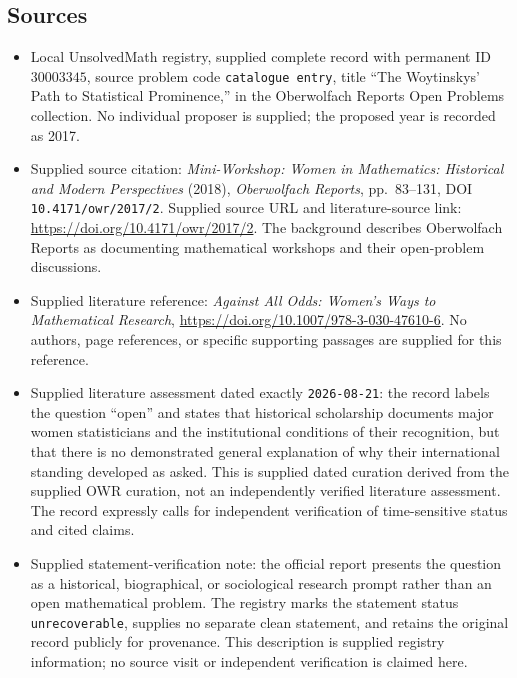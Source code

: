 \documentclass[11pt]{article}
\begin{document}
\subsection{Sources}
\begin{itemize}
\item Local UnsolvedMath registry, supplied complete record with permanent ID \(30003345\), source problem code \texttt{catalogue entry}, title ``The Woytinskys' Path to Statistical Prominence,'' in the Oberwolfach Reports Open Problems collection. No individual proposer is supplied; the proposed year is recorded as 2017.
\item Supplied source citation: \emph{Mini-Workshop: Women in Mathematics: Historical and Modern Perspectives} (2018), \emph{Oberwolfach Reports}, pp.~83--131, DOI \texttt{10.4171/owr/2017/2}. Supplied source URL and literature-source link: \url{https://doi.org/10.4171/owr/2017/2}. The background describes Oberwolfach Reports as documenting mathematical workshops and their open-problem discussions.
\item Supplied literature reference: \emph{Against All Odds: Women's Ways to Mathematical Research}, \url{https://doi.org/10.1007/978-3-030-47610-6}. No authors, page references, or specific supporting passages are supplied for this reference.
\item Supplied literature assessment dated exactly \texttt{2026-08-21}: the record labels the question ``open'' and states that historical scholarship documents major women statisticians and the institutional conditions of their recognition, but that there is no demonstrated general explanation of why their international standing developed as asked. This is supplied dated curation derived from the supplied OWR curation, not an independently verified literature assessment. The record expressly calls for independent verification of time-sensitive status and cited claims.
\item Supplied statement-verification note: the official report presents the question as a historical, biographical, or sociological research prompt rather than an open mathematical problem. The registry marks the statement status \texttt{unrecoverable}, supplies no separate clean statement, and retains the original record publicly for provenance. This description is supplied registry information; no source visit or independent verification is claimed here.
\end{itemize}
\end{document}
